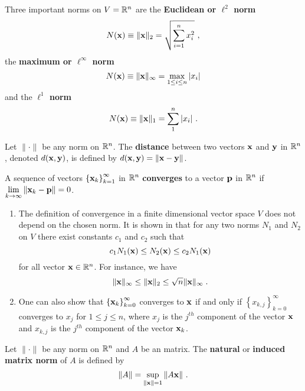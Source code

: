 \begin{rmk}
Three important norms on $V=\mathbb{R}^n$ are the
{\bfseries Euclidean or $\mathbf \ell^2$ norm}
\[
N(\mathbf{x}) \equiv \|\mathbf{x} \|_2 = \sqrt{\sum_{i=1}^{n} x_i^2} \ ,
\]
the {\bfseries maximum or $\mathbf \ell^\infty$ norm} 
\[
N(\mathbf{x}) \equiv \| \mathbf{x} \|_{\infty} = \max_{1\leq i \leq n} |x_i|
\]
and the {\bfseries $\mathbf \ell^1$ norm}
\[
N(\mathbf{x}) \equiv \| \mathbf{x} \|_1 = \sum_1^n |x_i| \ .
\]
\end{rmk}

\begin{defn}
Let $\|\cdot\|$ be any norm on $\mathbb{R}^n$.  The
{\bfseries distance}
between two vectors $\mathbf{x}$ and $\mathbf{y}$ in $\mathbb{R}^n$,
denoted $d(\mathbf{x},\mathbf{y})$, is defined by 
$d(\mathbf{x},\mathbf{y}) = \| \mathbf{x} - \mathbf{y} \|$.
\end{defn}

\begin{defn}
A sequence of vectors
$\displaystyle \left\{\mathbf{x}_k\right\}_{k=1}^\infty$ in
$\mathbb{R}^n$ {\bfseries converges} to a vector $\mathbf{p}$
in $\mathbb{R}^n$ if $\displaystyle \lim_{k\to \infty} \| \mathbf{x}_k - \mathbf{p} \| = 0$.
\end{defn}

\begin{rmkList} \label{equiv_norms}
\begin{enumerate}
\item The definition of convergence in a finite dimensional vector
space $V$ does not depend on the chosen norm.  It is shown in
\cite{HS} that for any two norms $N_1$ and $N_2$ on $V$ there exist
constants $c_1$ and $c_2$ such that
\[
c_1 N_1(\mathbf{x}) \leq N_2(\mathbf{x}) \leq c_2 N_1(\mathbf{x})
\]
for all vector $\mathbf{x} \in \mathbb{R}^n$.
For instance, we have
\[
\|\mathbf{x}\|_\infty \leq \|\mathbf{x}\|_2 \leq \sqrt{n}\|\mathbf{x}\|_\infty \; .
\]
\item One can also show that
$\displaystyle \left\{\mathbf{x}_k\right\}_{k=0}^\infty$
converges to $\mathbf{x}$ if and only if
$\displaystyle \left\{x_{k,j}\right\}_{k=0}^\infty$
converges to $x_j$ for $1\leq j \leq n$, where $x_j$ is the
$j^{th}$ component of the vector $\mathbf{x}$ and $x_{k,j}$ is the
$j^{th}$ component of the vector $\mathbf{x}_k$.
\end{enumerate}
\end{rmkList}

\begin{defn}
Let $\|\cdot\|$ be any norm on $\mathbb{R}^n$ and
$A$ be an \nn matrix.  The
{\bfseries natural} or
{\bfseries induced matrix norm}
of $A$ is defined by 
\[
\| A \| = \sup_{\|\mathbf{x} \| =1 } \| A \mathbf{x} \| \ .
\]
\end{defn}

